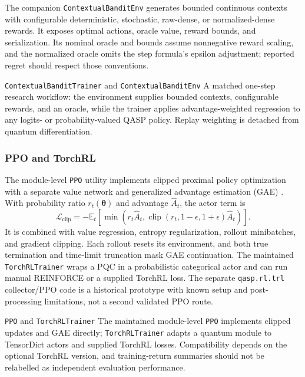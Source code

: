 \documentclass[10pt]{article}
\newcommand{\code}[1]{\texttt{#1}}
\newcommand{\E}{\mathbb{E}}
\begin{document}
The companion \code{ContextualBanditEnv} generates bounded continuous contexts
with configurable deterministic, stochastic, raw-dense, or normalized-dense
rewards.  It exposes optimal actions, oracle value, reward bounds, and
serialization.  Its nominal oracle and bounds assume nonnegative reward
scaling, and the normalized oracle omits the step formula's epsilon adjustment;
reported regret should respect those conventions.

\begin{qaspfeature}{\code{ContextualBanditTrainer} and \code{ContextualBanditEnv}}
A matched one-step research workflow: the environment supplies bounded
contexts, configurable rewards, and an oracle, while the trainer applies
advantage-weighted regression to any logits- or probability-valued QASP
policy.  Replay weighting is detached from quantum differentiation.
\end{qaspfeature}

\subsubsection{PPO and TorchRL}

The module-level \code{PPO} utility implements clipped proximal policy optimization with a separate value network and generalized advantage estimation (GAE) \cite{schulman2017ppo}.  With probability ratio $r_t(\bm{\theta})$ and advantage $\widehat A_t$, the actor term is
\begin{equation}
  \mathcal{L}_{\mathrm{clip}}=-\E_t\!\left[
  \min\left(r_t\widehat A_t,
  \operatorname{clip}(r_t,1-\epsilon,1+\epsilon)\widehat A_t\right)
  \right].
\end{equation}
It is combined with value regression, entropy regularization, rollout
minibatches, and gradient clipping.  Each rollout resets its environment, and
both true termination and time-limit truncation mask GAE continuation.  The
maintained \code{TorchRLTrainer} wraps a PQC in a probabilistic categorical
actor and can run manual REINFORCE or a supplied TorchRL loss.  The separate
\code{qasp.rl.trl} collector/PPO code is a historical prototype with known
setup and post-processing limitations, not a second validated PPO route.

\begin{qaspfeature}{\code{PPO} and \code{TorchRLTrainer}}
The maintained module-level \code{PPO} implements clipped updates and GAE
directly; \code{TorchRLTrainer} adapts a quantum module to TensorDict actors
and supplied TorchRL losses.  Compatibility depends on the optional TorchRL
version, and training-return summaries should not be relabelled as independent
evaluation performance.
\end{qaspfeature}
\end{document}
